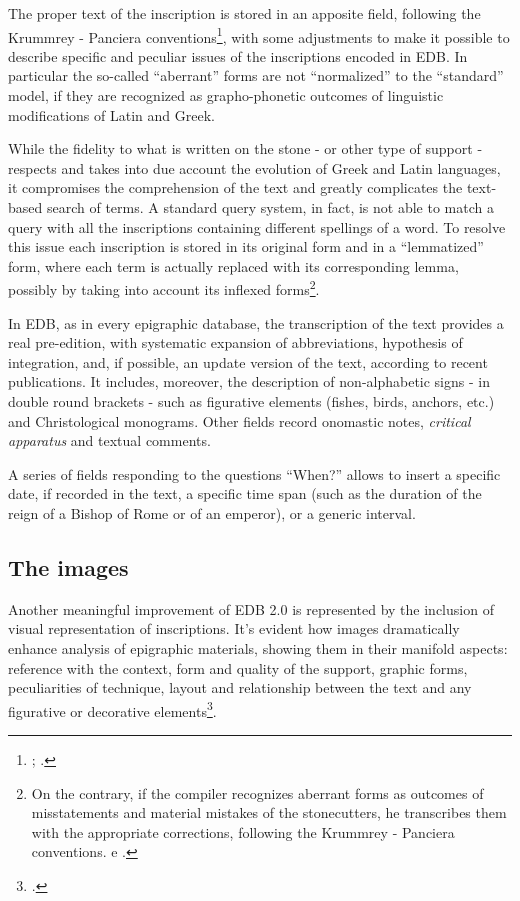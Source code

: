 \documentclass[amsthm,ebook]{saparticle}
\begin{document}
The proper text of the inscription is stored in an apposite field, following the Krummrey - Panciera
conventions\footnote{\citet{krummrey_criteri_1980}; \citet{Panciera1991}.}, with some adjustments to make it possible to describe
specific and peculiar issues of the inscriptions encoded in EDB. In particular the so-called
``aberrant'' forms are not ``normalized'' to the
``standard'' model, if they are recognized as grapho-phonetic outcomes of linguistic
modifications of Latin and Greek. 

While the fidelity to what is written on the stone - or other type of support - respects and takes into due account the
evolution of Greek and Latin languages, it compromises the comprehension of the text and greatly complicates the
text-based search of terms. A standard query system, in fact, is not able to match a query with all the inscriptions
containing different spellings of a word. To resolve this issue each inscription is stored in its original form and in
a ``lemmatized'' form, where each term is actually replaced with its corresponding lemma, possibly by taking into account
its inflexed forms\footnote{ On the contrary, if the compiler recognizes aberrant forms as outcomes of misstatements
and material mistakes of the stonecutters, he transcribes them with the appropriate corrections, following the Krummrey
- Panciera conventions. \citet{felle_perspectives_2014} e \citet{orlandi_improving_2014}.}.

In EDB, as in every epigraphic database, the transcription of the text provides a real pre-edition, with systematic
expansion of abbreviations, hypothesis of integration, and, if possible, an update version of the text, according to
recent publications. It includes, moreover, the description of non-alphabetic signs - in double round brackets - such
as figurative elements (fishes, birds, anchors, etc.) and Christological monograms. Other fields record onomastic
notes, \emph{critical apparatus} and textual comments. 

A series of fields responding to the questions “When?” allows to insert a specific date, if recorded in the text, a
specific time span (such as the duration of the reign of a Bishop of Rome or of an emperor), or a generic interval.




\subsection{The images}


Another meaningful improvement of EDB 2.0 is represented by the inclusion of visual representation of inscriptions. It’s
evident how images dramatically enhance analysis of epigraphic materials, showing them in their manifold aspects:
reference with the context, form and quality of the support, graphic forms, peculiarities of technique, layout and
relationship between the text and any figurative or decorative elements\footnote{\citet{panciera_cronistoria_2006}.}.
\end{document}
